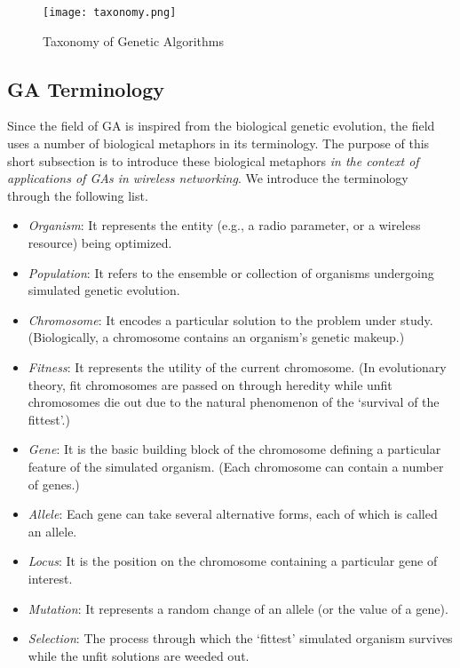 \documentclass[journal]{IEEEtran}
\begin{document}
\begin{figure*}[ht!]
\centering
\texttt{[image: taxonomy.png]}
\captionsetup{justification=centering,margin=2cm}
\caption{Taxonomy of Genetic Algorithms}
\label{fig:taxonomy}
\end{figure*}

\subsection{GA Terminology}

Since the field of GA is inspired from the biological genetic evolution, the field uses a number of biological metaphors in its terminology. The purpose of this short subsection is to introduce these biological metaphors \emph{in the context of applications of GAs in wireless networking}. We introduce the terminology through the following list. 

\begin{itemize}

\item \emph{Organism}: It represents the entity (e.g., a radio parameter, or a wireless resource) being optimized. 

\item \emph{Population}: It refers to the ensemble or collection of organisms undergoing simulated genetic evolution.

\item \emph{Chromosome}: It encodes a particular solution to the problem under study. (Biologically, a chromosome contains an organism's genetic makeup.)  

\item \emph{Fitness}: It represents the utility of the current chromosome. (In evolutionary theory, fit chromosomes are passed on through heredity while unfit chromosomes die out due to the natural phenomenon of the `survival of the fittest'.) 

\item \emph{Gene}: It is the basic building block of the chromosome defining a particular feature of the simulated organism. (Each chromosome can contain a 
number of genes.)

\item \emph{Allele}: Each gene can take several alternative forms, each of which is called an allele. 

\item \emph{Locus}: It is the position on the chromosome containing a particular gene of interest.

\item \emph{Mutation}: It represents a random change of an allele (or the value of a gene). 

\item \emph{Selection}: The process through which the `fittest' simulated organism survives while the unfit solutions are weeded out.

\end{itemize}
\end{document}
